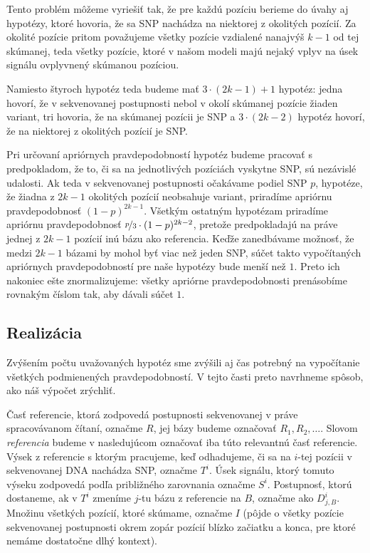 Tento problém môžeme vyriešiť tak, že pre každú pozíciu berieme do úvahy aj hypotézy, ktoré hovoria, že 
sa SNP nachádza na niektorej z okolitých pozícií. Za okolité pozície pritom považujeme všetky pozície
vzdialené nanajvýš $k-1$ od tej skúmanej, teda všetky pozície, ktoré v našom modeli majú nejaký vplyv
na úsek signálu ovplyvnený skúmanou pozíciou.


Namiesto štyroch hypotéz teda budeme mať $3 \cdot (2k-1) + 1$ hypotéz: jedna hovorí, že v sekvenovanej 
postupnosti nebol v okolí skúmanej pozície žiaden variant, tri hovoria, že na skúmanej pozícii je SNP a
$3 \cdot (2k-2)$ hypotéz hovorí, že na niektorej z okolitých pozícií je SNP.

Pri určovaní apriórnych pravdepodobností hypotéz budeme pracovať s predpokladom, že to, či sa na 
jednotlivých
pozíciách vyskytne SNP, sú nezávislé udalosti.
Ak teda v sekvenovanej postupnosti očakávame podiel SNP $p$, hypotéze, že žiadna z $2k-1$ okolitých 
pozícií neobsahuje variant, priradíme apriórnu pravdepodobnosť $(1-p)^{2k-1}$. Všetkým ostatným 
hypotézam 
priradíme apriórnu pravdepodobnosť $\nicefrac{p}{3} \cdot (1-p)^{2k-2}$, pretože predpokladajú na
práve jednej z $2k-1$ pozícií inú bázu ako referencia. Keďže zanedbávame možnosť, že medzi $2k-1$
bázami by mohol byť viac než jeden SNP, súčet takto vypočítaných apriórnych pravdepodobností pre
naše hypotézy bude menší než $1$. Preto ich nakoniec ešte znormalizujeme: všetky apriórne 
pravdepodobnosti prenásobíme rovnakým číslom tak, aby dávali súčet $1$.


\subsection{Realizácia}

Zvýšením počtu uvažovaných hypotéz sme zvýšili aj čas potrebný na vypočítanie všetkých
podmienených pravdepodobností. V tejto časti preto navrhneme spôsob, ako náš výpočet zrýchliť.

Časť referencie, ktorá zodpovedá postupnosti sekvenovanej v práve spracovávanom čítaní, označme
$R$, jej bázy budeme označovať $R_1, R_2, \dots$. Slovom \emph{referencia} budeme v nasledujúcom
označovať iba túto relevantnú časť referencie.
Výsek z referencie s ktorým pracujeme, keď odhadujeme, či sa na $i$-tej pozícii v sekvenovanej
DNA nachádza SNP, označme $T^i$. Úsek signálu, ktorý tomuto výseku zodpovedá podľa približného
zarovnania označme $S^i$. Postupnosť, ktorú dostaneme, ak v $T^i$ zmeníme $j$-tu bázu z referencie
na $B$, označme ako $D_{j,B}^i$. Množinu všetkých pozícií, ktoré skúmame, označme $I$ (pôjde o všetky
pozície sekvenovanej postupnosti okrem zopár pozícií blízko začiatku a konca, pre ktoré nemáme
dostatočne dlhý kontext).

